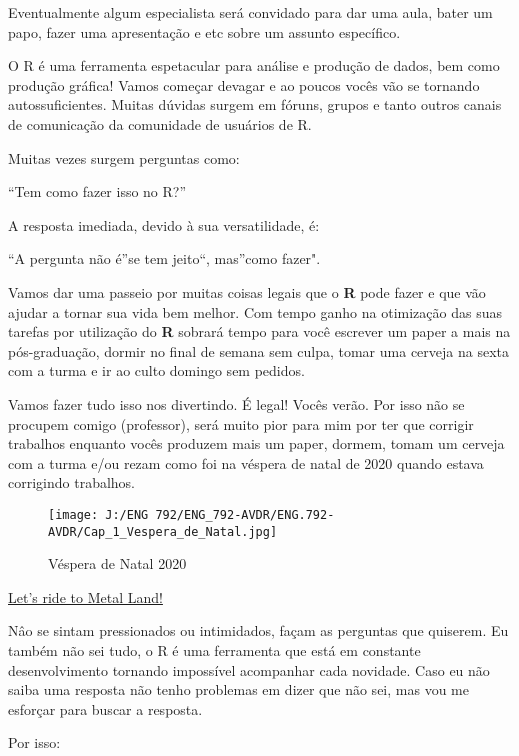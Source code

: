 \documentclass[
]{book}
\begin{document}
Eventualmente algum especialista será convidado para dar uma aula, bater um papo, fazer uma apresentação e etc sobre um assunto específico.

O R é uma ferramenta espetacular para análise e produção de dados, bem como produção gráfica! Vamos começar devagar e ao poucos vocês vão se tornando autossuficientes.
Muitas dúvidas surgem em fóruns, grupos e tanto outros canais de comunicação da comunidade de usuários de R.

Muitas vezes surgem perguntas como:

``Tem como fazer isso no R?''

A resposta imediada, devido à sua versatilidade, é:

``A pergunta não é''se tem jeito``, mas''como fazer".

Vamos dar uma passeio por muitas coisas legais que o \textbf{R} pode fazer e que vão ajudar a tornar sua vida bem melhor. Com tempo ganho na otimização das suas tarefas por utilização do \textbf{R} sobrará tempo para você escrever um paper a mais na pós-graduação, dormir no final de semana sem culpa, tomar uma cerveja na sexta com a turma e ir ao culto domingo sem pedidos.

Vamos fazer tudo isso nos divertindo. É legal! Vocês verão. Por isso não se procupem comigo (professor), será muito pior para mim por ter que corrigir trabalhos enquanto vocês produzem mais um paper, dormem, tomam um cerveja com a turma e/ou rezam como foi na véspera de natal de 2020 quando estava corrigindo trabalhos.

\begin{figure}
\hypertarget{id}{%
\centering
\texttt{[image: J:/ENG 792/ENG\_792-AVDR/ENG.792-AVDR/Cap\_1\_Vespera\_de\_Natal.jpg]}
\caption{Véspera de Natal 2020}\label{id}
}
\end{figure}

\href{https://www.youtube.com/watch?v=N8E4s8yAoX4\&ab_channel=MassacrationOficial}{Let's ride to Metal Land!}

Nâo se sintam pressionados ou intimidados, façam as perguntas que quiserem. Eu também não sei tudo, o R é uma ferramenta que está em constante desenvolvimento tornando impossível acompanhar cada novidade. Caso eu não saiba uma resposta não tenho problemas em dizer que não sei, mas vou me esforçar para buscar a resposta.

Por isso:
\end{document}
